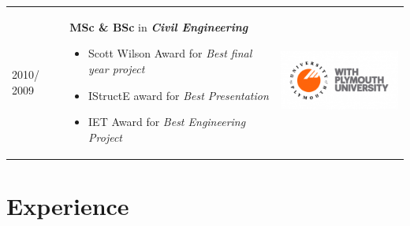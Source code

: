 \documentclass[letterpaper]{twentysecondcv} %
\begin{document}
\begin{table}[ht]
\begin{tabular}{p{} p{} m{}}
2010/ 2009 & \textbf{MSc \& BSc} in \textbf{\textit{Civil Engineering}} 
\begin{itemize}\setlength\parskip{0pt} 
\item  Scott Wilson Award for \textit{Best final year project}
\item IStructE award for \textit{Best Presentation} 
\item IET Award for \textit{Best Engineering Project} 
\end{itemize} &
\href{https://www.plymouth.ac.uk/courses/postgraduate/msc-civil-engineering}{\includegraphics[width = 0.9\linewidth]{Figures/plym2.png}}\\

\end{tabular}
\end{table}

\section{Experience}
\end{document}
